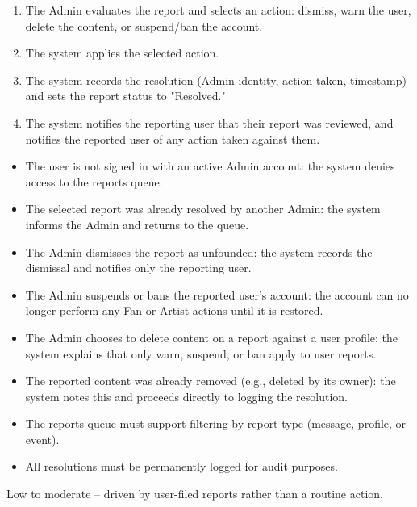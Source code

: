 \documentclass[11pt]{report}
\begin{document}
\begin{description}[leftmargin=2.2cm, style=nextline]
\begin{enumerate}
      \item The Admin evaluates the report and selects an action: dismiss, warn the user, delete the content, or suspend/ban the account.
      \item The system applies the selected action.
      \item The system records the resolution (Admin identity, action taken, timestamp) and sets the report status to "Resolved."
      \item The system notifies the reporting user that their report was reviewed, and notifies the reported user of any action taken against them.
    \end{enumerate}
  \item[Extensions]
    \begin{itemize}
      \item[*a.] The user is not signed in with an active Admin account: the system denies access to the reports queue.
      \item[3a.] The selected report was already resolved by another Admin: the system informs the Admin and returns to the queue.
      \item[5a.] The Admin dismisses the report as unfounded: the system records the dismissal and notifies only the reporting user.
      \item[5b.] The Admin suspends or bans the reported user's account: the account can no longer perform any Fan or Artist actions until it is restored.
      \item[5c.] The Admin chooses to delete content on a report against a user profile: the system explains that only warn, suspend, or ban apply to user reports.
      \item[6a.] The reported content was already removed (e.g., deleted by its owner): the system notes this and proceeds directly to logging the resolution.
    \end{itemize}
  \item[Special Requirements]
    \begin{itemize}
      \item The reports queue must support filtering by report type (message, profile, or event).
      \item All resolutions must be permanently logged for audit purposes.
    \end{itemize}
  \item[Frequency of Occurrence] Low to moderate -- driven by user-filed reports rather than a routine action.
\end{description}
\end{document}
